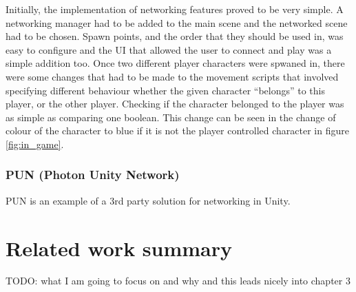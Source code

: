 Initially, the implementation of networking features proved to be very simple. A networking manager had to be added to the main scene and the networked scene had to be chosen. Spawn points, and the order that they should be used in, was easy to configure and the UI that allowed the user to connect and play was a simple addition too. Once two different player characters were spwaned in, there were some changes that had to be made to the movement scripts that involved specifying different behaviour whether the given character ``belongs'' to this player, or the other player. Checking if the character belonged to the player was as simple as comparing one boolean. This change can be seen in the change of colour of the character to blue if it is not the player controlled character in figure \ref{fig:in_game}.





\newpage

\subsubsection{PUN (Photon Unity Network)}
PUN is an example of a 3rd party solution for networking in Unity.


\section{Related work summary}
TODO: what I am going to focus on and why and this leads nicely into chapter 3
